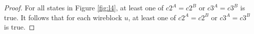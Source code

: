 \documentclass[12pt]{report}
\newtheorem*{lemma}{Lemma}
\begin{document}
\begin{proof}
For all states in Figure \ref{fig:l4}, at least one of $c2^A=c2^B$ or $c3^A=c3^B$ is true. It follows that for each wireblock $u$, at least one of $c2^A=c2^B$ or $c3^A=c3^B$ is true.
\end{proof}

\end{document}
